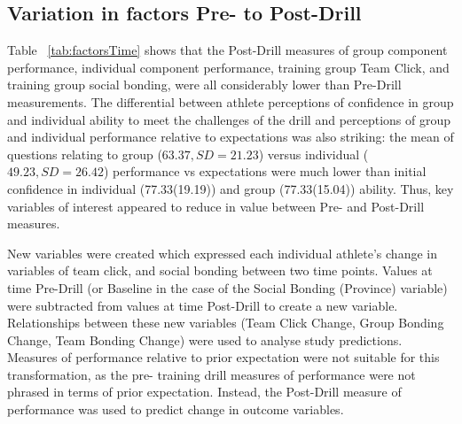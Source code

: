 



\subsection{Variation in factors Pre- to Post-Drill}



Table ~\ref{tab:factorsTime} shows that the Post-Drill measures of group component performance, individual component performance, training group Team Click, and training group social bonding, were all considerably lower than Pre-Drill measurements. The differential between athlete perceptions of confidence in group and individual ability to meet the challenges of the drill and perceptions of group and individual performance relative to expectations was also striking: the mean of questions relating to group ($63.37, SD = 21.23$) versus individual ($49.23, SD = 26.42$) performance vs expectations were much lower than initial confidence in individual (77.33(19.19)) and group (77.33(15.04)) ability.  Thus, key variables of interest appeared to reduce in value between Pre- and Post-Drill measures.



New variables were created which expressed each individual athlete's change in variables of team click, and social bonding between two time points.  Values at time Pre-Drill (or Baseline in the case of the Social Bonding (Province) variable) were subtracted from values at time Post-Drill to create a new variable.  Relationships between these new variables (Team Click Change, Group Bonding Change, Team Bonding Change) were used to analyse study predictions. Measures of performance relative to prior expectation were not suitable for this transformation, as the pre- training drill measures of performance were not phrased in terms of prior expectation.  Instead, the Post-Drill measure of performance was used to predict change in outcome variables.

